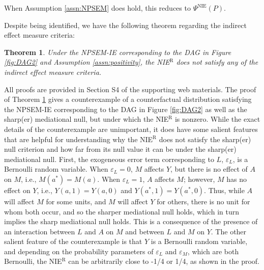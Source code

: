\documentclass[12pt]{article}
\newtheorem{theorem}{Theorem}
\begin{document}
\begin{comment}
\begin{align*}
    \Psi^{\text{NIE}^{\text{R}}}_{L}(P)\equiv & \; E\bigg[\int_m E\left\{E(Y\mid m,{\bf L},a,{\bf C})\mid a,{\bf C}\right\}\\
    &\times\{dF_{M\mid A,{\bf C}}(m\mid a,{\bf C}) - dF_{M\mid A,{\bf C}}(m\mid a^*,{\bf C})\}\bigg].
\end{align*}
\end{comment}
When Assumption \ref{assn:NPSEM} does hold, this reduces to $\Psi^{\text{NIE}}(P)$. 

Despite being identified, we have the following theorem regarding the indirect effect measure criteria:
\begin{theorem}
    \label{thm:recanting-SNC}
    Under the NPSEM-IE corresponding to the DAG in Figure \ref{fig:DAG2} and Assumption \ref{assn:positivity}, the NIE$^{\mathrm{R}}$ does not satisfy any of the indirect effect measure criteria. %
\end{theorem}
All proofs are provided in Section S4 of the supporting web materials. The proof of Theorem \ref{thm:recanting-SNC} gives a counterexample of a counterfactual distribution satisfying the NPSEM-IE corresponding to the DAG in Figure \ref{fig:DAG2} as well as the sharp(er) mediational null, but under which the NIE$^{\mathrm{R}}$ is nonzero. While the exact details of the counterexample are unimportant, it does have some salient features that are helpful for understanding why the NIE$^{\mathrm{R}}$ does not satisfy the sharp(er) null criterion and how far from its null value it can be under the sharp(er) mediational null. First, the exogeneous error term corresponding to $L$, $\varepsilon_L$, is a Bernoulli random variable. When $\varepsilon_L=0$, $M$ affects $Y$, but there is no effect of $A$ on $M$, i.e., $M(a^*)=M(a)$. When $\varepsilon_L=1$, $A$ affects $M$; however, $M$ has no effect on $Y$, i.e., $Y(a,1)=Y(a,0)$ and $Y(a^*,1)=Y(a^*,0)$. %
Thus, while $A$ will affect $M$ for some units, and $M$ will affect $Y$ for others, there is no unit for whom both occur, %
and so the sharper mediational null holds, which in turn implies the sharp mediational null holds. This is a consequence of the presence of an interaction between $L$ and $A$ on $M$ and between $L$ and $M$ on $Y$. The other salient feature of the counterexample is that $Y$ is a Bernoulli random variable, and depending on the probability parameters of $\varepsilon_L$ and $\varepsilon_M$, which are both Bernoulli, the NIE$^{\mathrm{R}}$ can be arbitrarily close to -1/4 or 1/4, as shown in the proof. %
\end{document}
